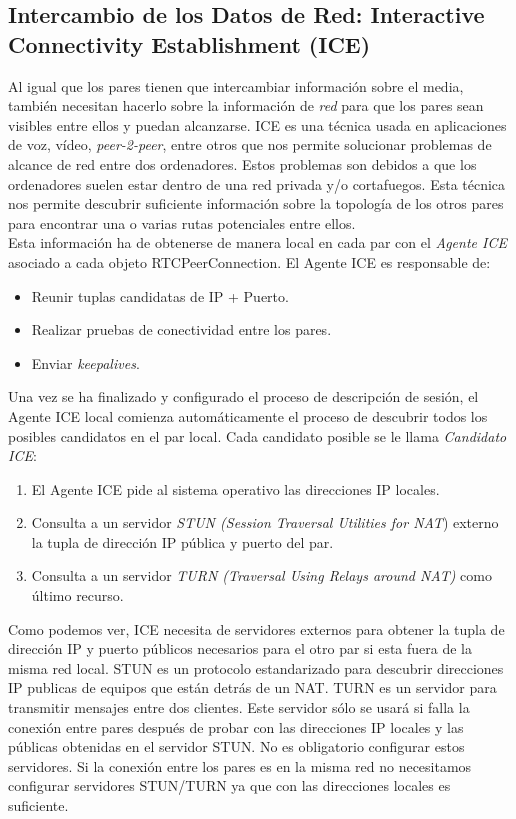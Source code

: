 \subsection{Intercambio de los Datos de Red: Interactive Connectivity Establishment (ICE)}

Al igual que los pares tienen que intercambiar información sobre el media, también necesitan hacerlo sobre la información de \textit{red} para que los pares sean visibles entre ellos y puedan alcanzarse. ICE es una técnica usada en aplicaciones de voz, vídeo, \emph{peer-2-peer}, entre otros que nos permite solucionar problemas de alcance de red entre dos ordenadores. Estos problemas son debidos a que los ordenadores suelen estar dentro de una red privada y/o cortafuegos. Esta técnica nos permite descubrir suficiente información sobre la topología de los otros pares para encontrar una o varias rutas potenciales entre ellos.\\

Esta información ha de obtenerse de manera local en cada par con el \textit{Agente ICE} asociado a cada objeto RTCPeerConnection. El Agente ICE es responsable de: 

\begin{itemize}
\item Reunir tuplas candidatas de IP + Puerto.
\item Realizar pruebas de conectividad entre los pares.
\item Enviar \textit{keepalives}.
\end{itemize}

Una vez se ha finalizado y configurado el proceso de descripción de sesión, el Agente ICE local comienza automáticamente el proceso de descubrir todos los posibles candidatos en el par local. Cada candidato posible se le llama \textit{Candidato ICE}:

\begin{enumerate}
\item El Agente ICE pide al sistema operativo las direcciones IP locales.
\item Consulta a un servidor \emph{STUN (Session Traversal Utilities for NAT}) externo la tupla de dirección IP pública y puerto del par.
\item Consulta a un servidor \emph{TURN (Traversal Using Relays around NAT)} como último recurso. 
\end{enumerate}

Como podemos ver, ICE necesita de servidores externos para obtener la tupla de dirección IP y puerto públicos necesarios para el otro par si esta fuera de la misma red local. STUN  es un protocolo estandarizado para descubrir direcciones IP publicas de equipos que están detrás de un NAT. TURN es un servidor para transmitir mensajes entre dos clientes. Este servidor sólo se usará si falla la conexión entre pares después de probar con las direcciones IP locales y las públicas obtenidas en el servidor STUN. No es obligatorio configurar estos servidores. Si la conexión entre los pares es en la misma red no necesitamos configurar servidores STUN/TURN ya que con las direcciones locales es suficiente.\\

